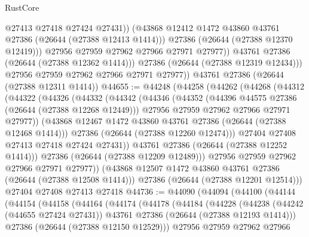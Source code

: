 \begin{lexlean}{RustCore}
\begin{coremodule}
                      @27413
                      @27418
                      @27424
                      @27431))
                  (@43868 @12412 @1472 @43860 @43761 @27386 (@26644 (@27388 @12413 @1414)))
                  @27386
                  (@26644 (@27388 @12370 @12419)))
                @27956
                @27959
                @27962
                @27966
                @27971
                @27977))
            @43761
            @27386
            (@26644 (@27388 @12362 @1414)))
          @27386
          (@26644 (@27388 @12319 @12434)))
        @27956
        @27959
        @27962
        @27966
        @27971
        @27977))
    @43761
    @27386
    (@26644 (@27388 @12311 @1414))
@44655 := @44248
    (@44258
      (@44262
        (@44268
          (@44312
            (@44322
              (@44326
                (@44332
                  (@44342
                    (@44346
                      (@44352
                        (@44396 @44575 @27386 (@26644 (@27388 @12268 @12449)))
                        @27956
                        @27959
                        @27962
                        @27966
                        @27971
                        @27977))
                    (@43868 @12467 @1472 @43860 @43761 @27386 (@26644 (@27388 @12468 @1414)))
                    @27386
                    (@26644 (@27388 @12260 @12474)))
                  @27404
                  @27408
                  @27413
                  @27418
                  @27424
                  @27431))
              @43761
              @27386
              (@26644 (@27388 @12252 @1414)))
            @27386
            (@26644 (@27388 @12209 @12489)))
          @27956
          @27959
          @27962
          @27966
          @27971
          @27977))
      (@43868 @12507 @1472 @43860 @43761 @27386 (@26644 (@27388 @12508 @1414)))
      @27386
      (@26644 (@27388 @12201 @12514)))
    @27404
    @27408
    @27413
    @27418
@44736 := @44090
    (@44094
      (@44100
        (@44144
          (@44154
            (@44158
              (@44164
                (@44174
                  (@44178
                    (@44184
                      (@44228
                        (@44238
                          (@44242 (@44655 @27424 @27431))
                          @43761
                          @27386
                          (@26644 (@27388 @12193 @1414)))
                        @27386
                        (@26644 (@27388 @12150 @12529)))
                      @27956
                      @27959
                      @27962
                      @27966

\end{coremodule}
\end{lexlean}
